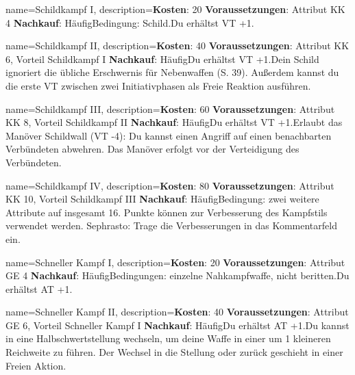 {
    name={Schildkampf I},
    description={\textbf{Kosten}: 20 \textbf{Voraussetzungen}: Attribut KK 4 \textbf{Nachkauf}: Häufig\newline Bedingung: Schild.\newline Du erhältst VT +1.}
}


{
    name={Schildkampf II},
    description={\textbf{Kosten}: 40 \textbf{Voraussetzungen}: Attribut KK 6, Vorteil Schildkampf I \textbf{Nachkauf}: Häufig\newline Du erhältst VT +1.\newline Dein Schild ignoriert die übliche Erschwernis für Nebenwaffen (S. 39). Außerdem kannst du die erste VT zwischen zwei Initiativphasen als Freie Reaktion ausführen.}
}


{
    name={Schildkampf III},
    description={\textbf{Kosten}: 60 \textbf{Voraussetzungen}: Attribut KK 8, Vorteil Schildkampf II \textbf{Nachkauf}: Häufig\newline Du erhältst VT +1.\newline Erlaubt das Manöver Schildwall (VT -4): Du kannst einen Angriff auf einen benachbarten Verbündeten abwehren. Das Manöver erfolgt vor der Verteidigung des Verbündeten.}
}


{
    name={Schildkampf IV},
    description={\textbf{Kosten}: 80 \textbf{Voraussetzungen}: Attribut KK 10, Vorteil Schildkampf III \textbf{Nachkauf}: Häufig\newline Bedingung: zwei weitere Attribute auf insgesamt 16. Punkte können zur Verbesserung des Kampfstils verwendet werden. Sephrasto: Trage die Verbesserungen in das Kommentarfeld ein.}
}


{
    name={Schneller Kampf I},
    description={\textbf{Kosten}: 20 \textbf{Voraussetzungen}: Attribut GE 4 \textbf{Nachkauf}: Häufig\newline Bedingungen: einzelne Nahkampfwaffe, nicht beritten.\newline Du erhältst AT +1.}
}


{
    name={Schneller Kampf II},
    description={\textbf{Kosten}: 40 \textbf{Voraussetzungen}: Attribut GE 6, Vorteil Schneller Kampf I \textbf{Nachkauf}: Häufig\newline Du erhältst AT +1.\newline Du kannst in eine Halbschwertstellung wechseln, um deine Waffe in einer um 1 kleineren Reichweite zu führen. Der Wechsel in die Stellung oder zurück geschieht in einer Freien Aktion.}
}


